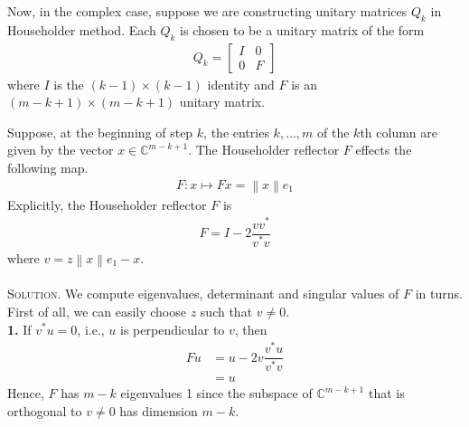 \documentclass[a4paper,oneside]{book}
\numberwithin{equation}{chapter}
\begin{document}
Now, in the complex case, suppose we are constructing unitary matrices $Q_k$ in Householder method. Each $Q_k$ is chosen to be a unitary matrix of the form
\begin{align}
{Q_k} = \left[ {\begin{array}{*{20}{c}}
I&0\\
0&F
\end{array}} \right]
\end{align}
where $I$ is the $\left( {k - 1} \right) \times \left( {k - 1} \right)$ identity and $F$ is an $\left( {m - k + 1} \right) \times \left( {m - k + 1} \right)$ unitary matrix.

Suppose, at the beginning of step $k$, the entries $k,\ldots,m$ of the $k$th column are given by the vector $x\in \mathbb{C}^{m-k+1}$. The Householder reflector $F$ effects the following map.
\begin{align}
F:x \mapsto Fx = \left\| x \right\|{e_1}
\end{align}
Explicitly, the Householder reflector $F$ is 
\begin{align}
F = I - 2\dfrac{{v{v^*}}}{{{v^*}v}}
\end{align}
where $v = z\left\| x \right\|{e_1} - x$.\\
\\
\textsc{Solution.} We compute eigenvalues, determinant and singular values of $F$ in turns. First of all, we can easily choose $z$ such that $v \ne 0$.\\
\textbf{1.} If $v^*u=0$, i.e., $u$ is perpendicular to $v$, then 
\begin{align}
Fu &= u - 2v\dfrac{{{v^*}u}}{{{v^*}v}}\\
& = u
\end{align}
Hence, $F$ has $m-k$ eigenvalues 1 since the subspace of $\mathbb{C}^{m-k+1}$ that is orthogonal to $v \ne 0$ has dimension $m-k$.
\end{document}
